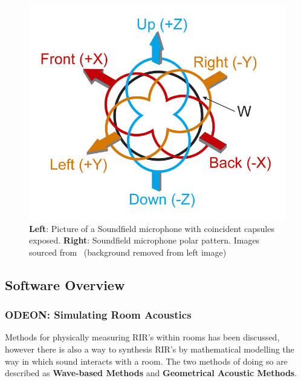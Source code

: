\documentclass[../../main.tex]{subfiles}
\begin{document}
\begin{figure}[ht]
\begin{minipage}{0.5\textwidth}
				\center\includegraphics[scale = 0.3]{Sections/Background/images/soundFieldPolar.jpg}
			\end{minipage}
			\caption{\textbf{Left}: Picture of a Soundfield microphone with coincident capsules exposed. \textbf{Right}: Soundfield microphone polar pattern. Images sourced from~\cite{soundfieldMic} (background removed from left image) }
			\label{sfMic}
		\end{figure}

	\subsection{Software Overview}

		\subsubsection{ODEON: Simulating Room Acoustics}
		\label{Software:Odeon}

			Methods for physically measuring \ac{RIR}'s within rooms has been discussed, however there is also a way to synthesis \ac{RIR}'s by mathematical modelling the way in which sound interacts with a room. The two methods of doing so are described as \textbf{Wave-based Methods} and \textbf{Geometrical Acoustic Methods}.
\end{document}

